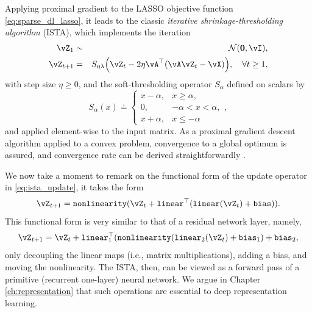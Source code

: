 \documentclass[../../book-main.tex]{subfiles}
\begin{document}
Applying proximal gradient to the LASSO objective function \eqref{eq:sparse_dl_lasso}, it leads to the classic \textit{iterative shrinkage-thresholding algorithm} (ISTA), which implements the iteration
\begin{eqnarray}
    \vZ_{1} &\sim& \dNorm(\vzero, \vI), \\
    \vZ_{t + 1} &=& S_{\eta\lambda}\rp{\vZ_{t} - 2\eta \vA^{\top}(\vA\vZ_{t} - \vX)}, \quad \forall t \geq 1,\label{eq:ista_update}
\end{eqnarray}
with step size \(\eta \geq 0\), and the soft-thresholding operator \(S_{\alpha}\) defined on scalars by
\begin{equation}
    S_{\alpha}(x) \doteq \begin{cases}x - \alpha, & x \geq \alpha, \\ 0, & -\alpha < x < \alpha, \\ x + \alpha, & x \leq -\alpha\end{cases},
\end{equation}
and applied element-wise to the input matrix.  As a proximal gradient descent algorithm applied to a convex problem, convergence to a global optimum is assured, and convergence rate can be derived straightforwardly \cite{Wright-Ma-2022}. 

We now take a moment to remark on the functional form of the update operator in \eqref{eq:ista_update}, it takes the form 
\begin{equation}
    \vZ_{t + 1} = \texttt{nonlinearity}(\vZ_{t} + \texttt{linear}^{\top}(\texttt{linear}(\vZ_{t}) + \texttt{bias})).
\end{equation}
This functional form is very similar to that of a residual network layer, namely,
\begin{equation}
    \vZ_{t + 1} = \vZ_{t} + \texttt{linear}_{1}^{\top}(\texttt{nonlinearity}(\texttt{linear}_{2}(\vZ_{t}) + \texttt{bias}_{1}) + \texttt{bias}_{2},
\end{equation}
only decoupling the linear maps (i.e., matrix multiplications), adding a bias, and moving the nonlinearity. The ISTA, then, can be viewed as a forward pass of a primitive (recurrent one-layer) neural network. We argue in Chapter \ref{ch:representation} that such operations are essential to deep representation learning.


\end{document}
